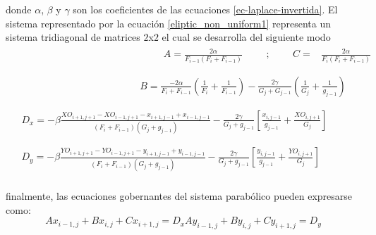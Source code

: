\documentclass[letterpaper, openright, 12pt]{book}
\begin{document}
		donde $\alpha$, $\beta$ y $\gamma$ son los coeficientes de las ecuaciones \ref{ec-laplace-invertida}. El sistema representado por la ecuación \ref{eliptic_non_uniform1} representa un sistema tridiagonal de matrices $2$x$2$ el cual se desarrolla del siguiente modo\\
		\begin{align*}
			&\begin{aligned}
			&&&&&&&&&&&&&&&&&&A = \frac{2\alpha}{F_{i - 1} (F_i + F_{i - 1}) } &&& ; &&& C =& \frac{2\alpha}{F_i (F_i + F_{i - 1}) }
			\end{aligned}\\ \\
			&\begin{aligned}
				&&&&&&&&&&&&&&&B = \frac{-2 \alpha}{F_i + F_{i - 1}} \left( \frac{1}{F_i} + \frac{1}{F_{i - 1}} \right) - \frac{2\gamma}{G_j + G_{j - 1}} \left( \frac{1}{G_j}  + \frac{1}{g_{j - 1}} \right)
			\end{aligned}\\ \\
			&\begin{aligned}
				D_x = -\beta \frac{ XO_{i+1, j+1} - XO_{i-1, j+1} - x_{i+1, j-1} + x_{i-1, j-1} }{ (F_i + F_{i - 1}) (G_j + g_{j - 1}) } - \frac{2 \gamma}{G_j + g_{j - 1}} \left[ \frac{x_{i, j - 1}}{g_{j-1}} + \frac{XO_{i, j + 1}}{G_j} \right]
			\end{aligned} \\ \\
			&\begin{aligned}
			D_y = -\beta \frac{ YO_{i+1, j+1} - YO_{i-1, j+1} - y_{i+1, j-1} + y_{i-1, j-1} }{ (F_i + F_{i - 1}) (G_j + g_{j - 1}) } - \frac{2 \gamma}{G_j + g_{j - 1}} \left[ \frac{y_{i, j - 1}}{g_{j-1}} + \frac{YO_{i, j + 1}}{G_j} \right]
			\end{aligned}
		\end{align*}\\
		finalmente, las ecuaciones gobernantes del sistema parabólico pueden expresarse como:\\
		\begin{subequations}
			\begin{equation}
			Ax_{i-1, j} + B x_{i, j} + Cx_{i+1, j} = D_x
			\end{equation}
			\begin{equation}
			Ay_{i-1, j} + B y_{i, j} + Cy_{i+1, j} = D_y
			\end{equation}
			\label{parabolic_final}
		\end{subequations}
	
\end{document}
